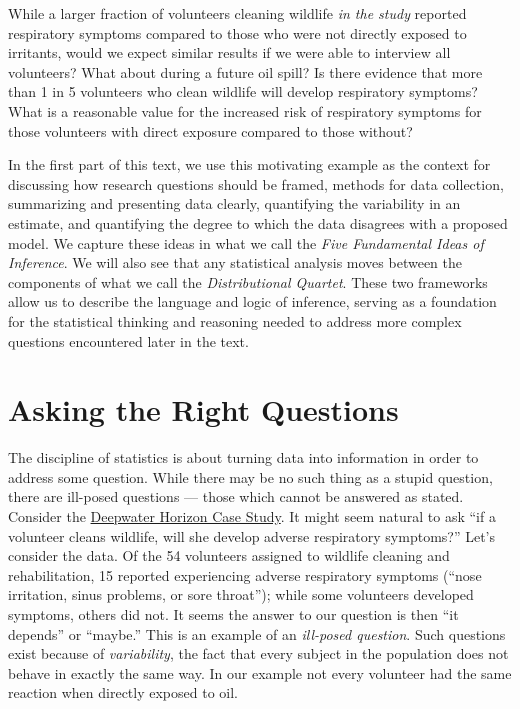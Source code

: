\documentclass[
]{book}
\theoremstyle{plain}
\theoremstyle{mydefn}
\theoremstyle{myexmpl}
\theoremstyle{remark}
\begin{document}
While a larger fraction of volunteers cleaning wildlife \emph{in the study} reported respiratory symptoms compared to those who were not directly exposed to irritants, would we expect similar results if we were able to interview all volunteers? What about during a future oil spill? Is there evidence that more than 1 in 5 volunteers who clean wildlife will develop respiratory symptoms? What is a reasonable value for the increased risk of respiratory symptoms for those volunteers with direct exposure compared to those without?

In the first part of this text, we use this motivating example as the context for discussing how research questions should be framed, methods for data collection, summarizing and presenting data clearly, quantifying the variability in an estimate, and quantifying the degree to which the data disagrees with a proposed model. We capture these ideas in what we call the \emph{Five Fundamental Ideas of Inference}. We will also see that any statistical analysis moves between the components of what we call the \emph{Distributional Quartet}. These two frameworks allow us to describe the language and logic of inference, serving as a foundation for the statistical thinking and reasoning needed to address more complex questions encountered later in the text.

\hypertarget{Questions}{%
\chapter{Asking the Right Questions}\label{Questions}}

The discipline of statistics is about turning data into information in order to address some question. While there may be no such thing as a stupid question, there are ill-posed questions --- those which cannot be answered as stated. Consider the \protect\hyperlink{CaseDeepwater}{Deepwater Horizon Case Study}. It might seem natural to ask ``if a volunteer cleans wildlife, will she develop adverse respiratory symptoms?'' Let's consider the data. Of the 54 volunteers assigned to wildlife cleaning and rehabilitation, 15 reported experiencing adverse respiratory symptoms (``nose irritation, sinus problems, or sore throat''); while some volunteers developed symptoms, others did not. It seems the answer to our question is then ``it depends'' or ``maybe.'' This is an example of an \emph{ill-posed question}. Such questions exist because of \emph{variability}, the fact that every subject in the population does not behave in exactly the same way. In our example not every volunteer had the same reaction when directly exposed to oil.
\end{document}
